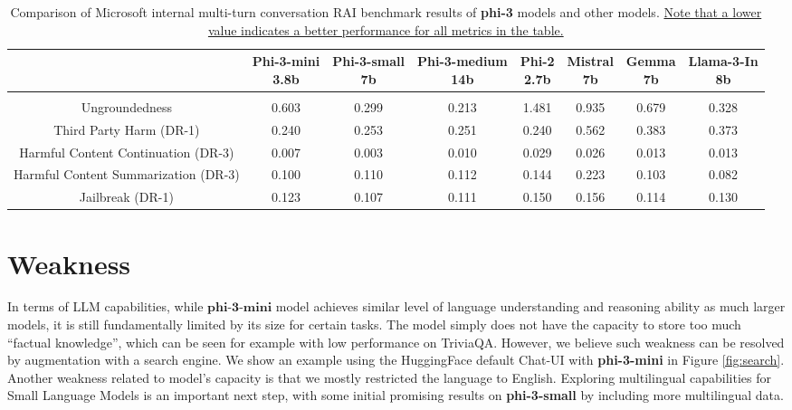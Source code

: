 \documentclass[11pt]{article}
\begin{document}
\begin{table}
\begin{center}
    \begin{adjustbox}{width=0.95\textwidth,center}
    \setlength\extrarowheight{6pt}
        \begin{tabular}{ c||ccccccc } 
        & \makecell{Phi-3-mini \\ \footnotesize 3.8b} & \makecell{Phi-3-small \\ \footnotesize 7b} & \makecell{Phi-3-medium \\ \footnotesize 14b} & \makecell{Phi-2 \\ \footnotesize 2.7b } & \makecell{Mistral\\ \footnotesize 7b } & \makecell{Gemma \\ \footnotesize 7b} & \makecell{Llama-3-In \\ \footnotesize 8b} \\
        \hline & \\[-3.5ex]
        Ungroundedness  & 0.603 & 0.299 & 0.213 & 1.481 & 0.935 & 0.679 & 0.328  \\
        Third Party Harm (DR-1) & 0.240 & 0.253 & 0.251 & 0.240 & 0.562 & 0.383 & 0.373 \\
        Harmful Content Continuation (DR-3) & 0.007 & 0.003 & 0.010 & 0.029 & 0.026 & 0.013 & 0.013 \\
        Harmful Content Summarization (DR-3) & 0.100 & 0.110 & 0.112 & 0.144 & 0.223 & 0.103 & 0.082 \\
        Jailbreak (DR-1) & 0.123 & 0.107 & 0.111 & 0.150 & 0.156 & 0.114 & 0.130 \\
        \end{tabular}
    \end{adjustbox}
\end{center}
\caption{Comparison of Microsoft internal multi-turn conversation RAI benchmark results of \textbf{phi-3} models and other models. \uline{Note that a lower value indicates a better performance for all metrics in the table.}}
\label{tab:rai-benchmarks}
\end{table}

\section{Weakness}
In terms of LLM capabilities, while $\textbf{phi-3-mini}$ model achieves similar level of language understanding and reasoning ability as much larger models, it is still fundamentally limited by its size for certain tasks. The model simply does not have the capacity to store too much ``factual knowledge'', which can be seen for example with low performance on TriviaQA.
However, we believe such weakness can be resolved by augmentation with a search engine. We show an example using the HuggingFace default Chat-UI with \textbf{phi-3-mini} in Figure \ref{fig:search}. Another weakness related to model's capacity is that we mostly restricted the language to English. Exploring multilingual capabilities for Small Language Models is an important next step, with some initial promising results on \textbf{phi-3-small} by including more multilingual data.
\end{document}
